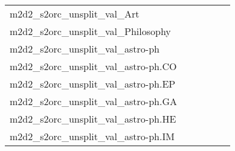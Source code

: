 {\begin{longtable}{m{6cm}m{1.7cm}m{1.7cm}m{1.7cm}m{1.7cm}m{1.7cm}}
	m2d2\_s2orc\_unsplit\_val\_Art  & \colorbox[HTML]{f7fcbe}{\makebox[\mywidth][c]{20.07}} & \colorbox[HTML]{e0f2a8}{\makebox[\mywidth][c]{19.80}} & \colorbox[HTML]{ffffe5}{\makebox[\mywidth][c]{21.88}} & \colorbox[HTML]{ddf1a6}{\makebox[\mywidth][c]{19.78}} & \colorbox[HTML]{77c578}{\makebox[\mywidth][c]{19.44}}\\
	m2d2\_s2orc\_unsplit\_val\_Philosophy  & \colorbox[HTML]{ddf1a6}{\makebox[\mywidth][c]{14.80}} & \colorbox[HTML]{e0f2a8}{\makebox[\mywidth][c]{14.82}} & \colorbox[HTML]{ffffe5}{\makebox[\mywidth][c]{16.77}} & \colorbox[HTML]{c5e799}{\makebox[\mywidth][c]{14.69}} & \colorbox[HTML]{77c578}{\makebox[\mywidth][c]{14.47}}\\
	m2d2\_s2orc\_unsplit\_val\_astro-ph  & \colorbox[HTML]{eef8b2}{\makebox[\mywidth][c]{11.70}} & \colorbox[HTML]{eef8b2}{\makebox[\mywidth][c]{11.70}} & \colorbox[HTML]{ffffe5}{\makebox[\mywidth][c]{13.18}} & \colorbox[HTML]{cdeb9d}{\makebox[\mywidth][c]{11.52}} & \colorbox[HTML]{77c578}{\makebox[\mywidth][c]{11.33}}\\
	m2d2\_s2orc\_unsplit\_val\_astro-ph.CO  & \colorbox[HTML]{e9f6af}{\makebox[\mywidth][c]{11.47}} & \colorbox[HTML]{ecf7b1}{\makebox[\mywidth][c]{11.49}} & \colorbox[HTML]{ffffe5}{\makebox[\mywidth][c]{12.90}} & \colorbox[HTML]{d9f0a3}{\makebox[\mywidth][c]{11.37}} & \colorbox[HTML]{77c578}{\makebox[\mywidth][c]{11.15}}\\
	m2d2\_s2orc\_unsplit\_val\_astro-ph.EP  & \colorbox[HTML]{e5f5ac}{\makebox[\mywidth][c]{12.76}} & \colorbox[HTML]{e0f2a8}{\makebox[\mywidth][c]{12.73}} & \colorbox[HTML]{ffffe5}{\makebox[\mywidth][c]{14.28}} & \colorbox[HTML]{bbe395}{\makebox[\mywidth][c]{12.60}} & \colorbox[HTML]{77c578}{\makebox[\mywidth][c]{12.45}}\\
	m2d2\_s2orc\_unsplit\_val\_astro-ph.GA  & \colorbox[HTML]{eef8b2}{\makebox[\mywidth][c]{11.70}} & \colorbox[HTML]{eef8b2}{\makebox[\mywidth][c]{11.70}} & \colorbox[HTML]{ffffe5}{\makebox[\mywidth][c]{13.18}} & \colorbox[HTML]{cdeb9d}{\makebox[\mywidth][c]{11.52}} & \colorbox[HTML]{77c578}{\makebox[\mywidth][c]{11.33}}\\
	m2d2\_s2orc\_unsplit\_val\_astro-ph.HE  & \colorbox[HTML]{f1f9b4}{\makebox[\mywidth][c]{11.85}} & \colorbox[HTML]{e5f5ac}{\makebox[\mywidth][c]{11.77}} & \colorbox[HTML]{ffffe5}{\makebox[\mywidth][c]{13.29}} & \colorbox[HTML]{c2e698}{\makebox[\mywidth][c]{11.62}} & \colorbox[HTML]{77c578}{\makebox[\mywidth][c]{11.46}}\\
	m2d2\_s2orc\_unsplit\_val\_astro-ph.IM  & \colorbox[HTML]{ecf7b1}{\makebox[\mywidth][c]{15.36}} & \colorbox[HTML]{e8f6ae}{\makebox[\mywidth][c]{15.33}} & \colorbox[HTML]{ffffe5}{\makebox[\mywidth][c]{17.16}} & \colorbox[HTML]{d9f0a3}{\makebox[\mywidth][c]{15.21}} & \colorbox[HTML]{77c578}{\makebox[\mywidth][c]{14.92}}\\

\end{longtable}}
